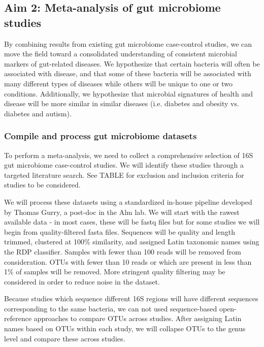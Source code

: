 \documentclass[12pt]{article}
\begin{document}
\subsection{Aim 2: Meta-analysis of gut microbiome studies}\label{sec:aim2}
By combining results from existing gut microbiome case-control 
studies, we can move the field toward a consolidated understanding of 
consistent microbial markers of gut-related diseases. We hypothesize 
that certain bacteria will often be associated with disease, and that 
some of these bacteria will be associated with many different types of 
diseases while others will be unique to one or two conditions. 
Additionally, we hypothesize that microbial signatures  of health and 
disease will be more similar in similar diseases (i.e. diabetes and 
obesity vs. diabetes and autism).

\subsubsection{Compile and process gut microbiome datasets}
To perform a meta-analysis, we need to collect a 
comprehensive selection of 16S gut microbiome case-control studies. We 
will identify these studies through a targeted literature search.  See 
TABLE for exclusion and inclusion criteria for studies to be 
considered.

We will process these datasets using a standardized in-house pipeline 
developed by Thomas Gurry, a post-doc in the Alm lab. We will 
start with the rawest available data - in most cases, these will be 
fastq files but for some studies we will begin from quality-filtered 
fasta files. Sequences will be quality and length trimmed, clustered 
at 100\% similarity, and assigned Latin taxonomic names using the RDP 
classifier. Samples with fewer than 100 reads will be removed from 
consideration. OTUs with fewer than 10 reads or which are present in 
less than 1\% of samples will be removed. More stringent quality 
filtering may be considered in order to reduce noise in the dataset.

Because studies which sequence different 16S regions will have 
different sequences corresponding to the same bacteria, we can not 
used sequence-based open-reference approaches to compare OTUs across 
studies. After assigning Latin names based on OTUs within each study, 
we will collapse OTUs to the genus level and compare these across 
studies.
\end{document}
